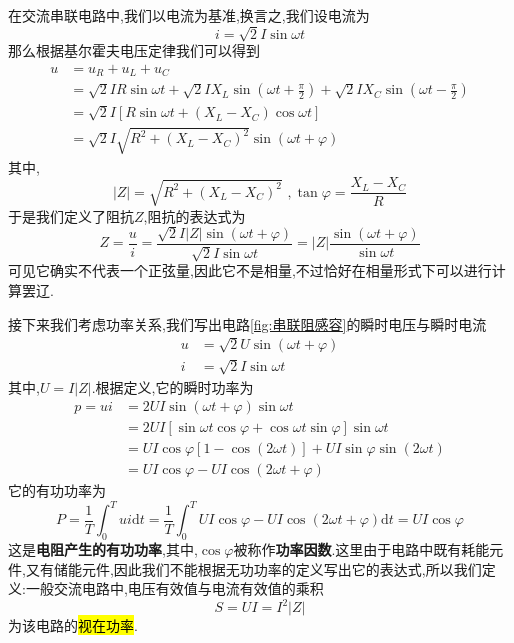\Par 在交流串联电路中,我们以电流为基准,换言之,我们设电流为
\begin{equation}
    i=\sqrt{2}I\sin \omega t
\end{equation}
那么根据基尔霍夫电压定律我们可以得到
\begin{align*}
	u&=u_R+u_L+u_C\\
	&=\sqrt{2}IR\sin \omega t+\sqrt{2}IX_L\sin \left( \omega t+\frac{\pi}{2} \right) +\sqrt{2}IX_C\sin \left( \omega t-\frac{\pi}{2} \right)\\
	&=\sqrt{2}I\left[ R\sin \omega t+\left( X_L-X_C \right) \cos \omega t \right]\\
	&=\sqrt{2}I\sqrt{R^2+\left( X_L-X_C \right) ^2}\sin \left( \omega t+\varphi \right)
\end{align*}
其中,
\begin{equation*}
    \left| Z \right|=\sqrt{R^2+\left( X_L-X_C \right) ^2}\,\, ,  \tan \varphi =\frac{X_L-X_C}{R}
\end{equation*}
于是我们定义了阻抗$Z$,阻抗的表达式为
\begin{equation}
    Z=\frac{u}{i}=\frac{\sqrt{2}I\left| Z \right|\sin \left( \omega t+\varphi \right)}{\sqrt{2}I\sin \omega t}=\left| Z \right|\frac{\sin \left( \omega t+\varphi \right)}{\sin \omega t}
\end{equation}
可见它确实不代表一个正弦量,因此它不是相量,不过恰好在相量形式下可以进行计算罢辽.

\Par 接下来我们考虑功率关系,我们写出电路\ref{fig:串联阻感容}的瞬时电压与瞬时电流
\begin{align*}
	u&=\sqrt{2}U\sin \left( \omega t+\varphi \right)\\
	i&=\sqrt{2}I\sin \omega t
\end{align*}
其中,$U=I\left| Z \right|$.根据定义,它的瞬时功率为
\begin{align*}
	p=ui&=2UI\sin \left( \omega t+\varphi \right) \sin \omega t\\
	&=2UI\left[ \sin \omega t\cos \varphi +\cos \omega t\sin \varphi \right] \sin \omega t\\
	&=UI\cos \varphi \left[ 1-\cos \left( 2\omega t \right) \right] +UI\sin \varphi \sin \left( 2\omega t \right)\\
	&=UI\cos \varphi -UI\cos \left( 2\omega t+\varphi \right)
\end{align*}
它的有功功率为
\begin{equation}\label{equ:功率因数}
    P=\frac{1}{T}\int_0^T{ui\mathrm{d}t}=\frac{1}{T}\int_0^T{UI\cos \varphi -UI\cos \left( 2\omega t+\varphi \right) \mathrm{d}t}=UI\cos \varphi 
\end{equation}
这是\textbf{电阻产生的有功功率},其中,$\cos \varphi $被称作\textbf{功率因数}.这里由于电路中既有耗能元件,又有储能元件,因此我们不能根据无功功率的定义写出它的表达式,所以我们定义:一般交流电路中,电压有效值与电流有效值的乘积
\begin{equation}
    S=UI=I^2\left| Z \right|
\end{equation}
为该电路的\hl{视在功率}.

